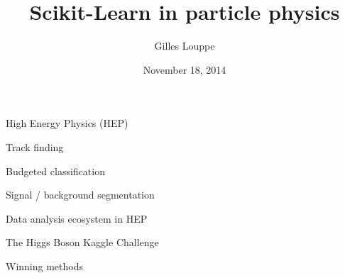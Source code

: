 \documentclass{beamer}
\title{{\bf Scikit-Learn in particle physics}}
\author{Gilles Louppe}
\institute{CERN, Switzerland}
\date{November 18, 2014}
\begin{document}
\renewcommand{\inserttotalframenumber}{XX}


\begin{frame}
\titlepage
\end{frame}


\begin{frame}{High Energy Physics (HEP)}
\end{frame}


\begin{frame}{Track finding}
\end{frame}


\begin{frame}{Budgeted classification}
\end{frame}


\begin{frame}{Signal / background segmentation}
\end{frame}


\begin{frame}{Data analysis ecosystem in HEP}
\end{frame}


\begin{frame}{The Higgs Boson Kaggle Challenge}
\end{frame}


\begin{frame}{Winning methods}

\end{frame}
\end{document}
